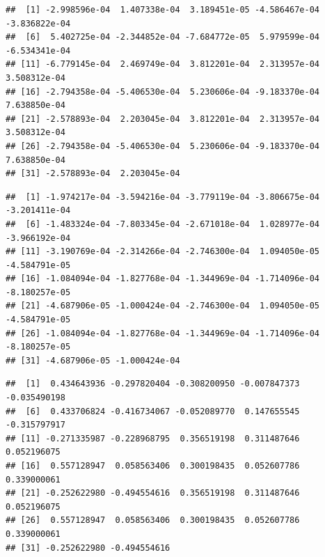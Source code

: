 \documentclass[
]{krantz}
\makeatletter
\newenvironment{Shaded}{\begin{snugshade}}{\end{snugshade}}
\newcommand{\NormalTok}[1]{#1}
\newcommand{\OperatorTok}[1]{\textcolor[rgb]{0.81,0.36,0.00}{\textbf{#1}}}
\newcommand{\StringTok}[1]{\textcolor[rgb]{0.31,0.60,0.02}{#1}}
\newenvironment{kframe}{%
\medskip{}
\setlength{\fboxsep}{.8em}
 \def\at@end@of@kframe{}%
 \ifinner\ifhmode%
  \def\at@end@of@kframe{\end{minipage}}%
  \begin{minipage}{\columnwidth}%
 \fi\fi%
 \def\FrameCommand##1{\hskip\@totalleftmargin \hskip-\fboxsep
 \colorbox{shadecolor}{##1}\hskip-\fboxsep
     \hskip-\linewidth \hskip-\@totalleftmargin \hskip\columnwidth}%
 \MakeFramed {\advance\hsize-\width
   \@totalleftmargin\z@ \linewidth\hsize
   \@setminipage}}%
 {\par\unskip\endMakeFramed%
 \at@end@of@kframe}
\renewenvironment{Shaded}{\begin{kframe}}{\end{kframe}}
\makeatother
\begin{document}
\begin{verbatim}
##  [1] -2.998596e-04  1.407338e-04  3.189451e-05 -4.586467e-04 -3.836822e-04
##  [6]  5.402725e-04 -2.344852e-04 -7.684772e-05  5.979599e-04 -6.534341e-04
## [11] -6.779145e-04  2.469749e-04  3.812201e-04  2.313957e-04  3.508312e-04
## [16] -2.794358e-04 -5.406530e-04  5.230606e-04 -9.183370e-04  7.638850e-04
## [21] -2.578893e-04  2.203045e-04  3.812201e-04  2.313957e-04  3.508312e-04
## [26] -2.794358e-04 -5.406530e-04  5.230606e-04 -9.183370e-04  7.638850e-04
## [31] -2.578893e-04  2.203045e-04
\end{verbatim}

\begin{Shaded}
\end{Shaded}

\begin{verbatim}
##  [1] -1.974217e-04 -3.594216e-04 -3.779119e-04 -3.806675e-04 -3.201411e-04
##  [6] -1.483324e-04 -7.803345e-04 -2.671018e-04  1.028977e-04 -3.966192e-04
## [11] -3.190769e-04 -2.314266e-04 -2.746300e-04  1.094050e-05 -4.584791e-05
## [16] -1.084094e-04 -1.827768e-04 -1.344969e-04 -1.714096e-04 -8.180257e-05
## [21] -4.687906e-05 -1.000424e-04 -2.746300e-04  1.094050e-05 -4.584791e-05
## [26] -1.084094e-04 -1.827768e-04 -1.344969e-04 -1.714096e-04 -8.180257e-05
## [31] -4.687906e-05 -1.000424e-04
\end{verbatim}

\begin{Shaded}
\end{Shaded}

\begin{verbatim}
##  [1]  0.434643936 -0.297820404 -0.308200950 -0.007847373 -0.035490198
##  [6]  0.433706824 -0.416734067 -0.052089770  0.147655545 -0.315797917
## [11] -0.271335987 -0.228968795  0.356519198  0.311487646  0.052196075
## [16]  0.557128947  0.058563406  0.300198435  0.052607786  0.339000061
## [21] -0.252622980 -0.494554616  0.356519198  0.311487646  0.052196075
## [26]  0.557128947  0.058563406  0.300198435  0.052607786  0.339000061
## [31] -0.252622980 -0.494554616
\end{verbatim}
\end{document}
